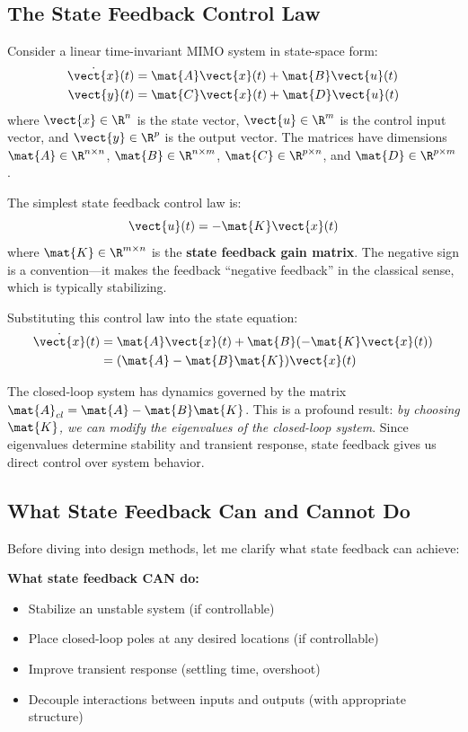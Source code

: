 \subsection{The State Feedback Control Law}

Consider a linear time-invariant MIMO system in state-space form:
\begin{align}
\dot{\vect{x}}(t) &= \mat{A}\vect{x}(t) + \mat{B}\vect{u}(t) \label{eq:state_eq}\\
\vect{y}(t) &= \mat{C}\vect{x}(t) + \mat{D}\vect{u}(t) \label{eq:output_eq}
\end{align}
where $\vect{x} \in \R^n$ is the state vector, $\vect{u} \in \R^m$ is the control input vector, and $\vect{y} \in \R^p$ is the output vector. The matrices have dimensions $\mat{A} \in \R^{n \times n}$, $\mat{B} \in \R^{n \times m}$, $\mat{C} \in \R^{p \times n}$, and $\mat{D} \in \R^{p \times m}$.

The simplest state feedback control law is:
\begin{equation}
\vect{u}(t) = -\mat{K}\vect{x}(t)
\label{eq:state_feedback_law}
\end{equation}
where $\mat{K} \in \R^{m \times n}$ is the \textbf{state feedback gain matrix}. The negative sign is a convention---it makes the feedback ``negative feedback'' in the classical sense, which is typically stabilizing.

Substituting this control law into the state equation:
\begin{align}
\dot{\vect{x}}(t) &= \mat{A}\vect{x}(t) + \mat{B}(-\mat{K}\vect{x}(t)) \nonumber \\
&= (\mat{A} - \mat{B}\mat{K})\vect{x}(t) \label{eq:closed_loop_dynamics}
\end{align}

The closed-loop system has dynamics governed by the matrix $\mat{A}_{cl} = \mat{A} - \mat{B}\mat{K}$. This is a profound result: \textit{by choosing $\mat{K}$, we can modify the eigenvalues of the closed-loop system}. Since eigenvalues determine stability and transient response, state feedback gives us direct control over system behavior.

\subsection{What State Feedback Can and Cannot Do}

Before diving into design methods, let me clarify what state feedback can achieve:

\textbf{What state feedback CAN do:}
\begin{itemize}
    \item Stabilize an unstable system (if controllable)
    \item Place closed-loop poles at any desired locations (if controllable)
    \item Improve transient response (settling time, overshoot)
    \item Decouple interactions between inputs and outputs (with appropriate structure)
\end{itemize}

